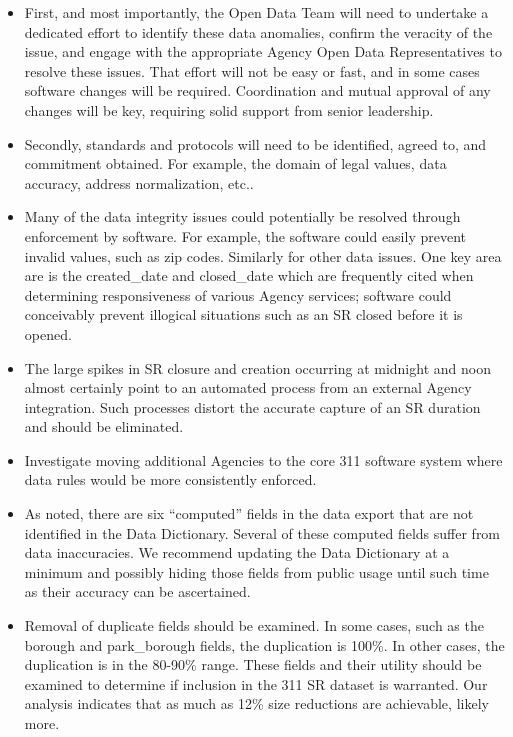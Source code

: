 \documentclass[12pt, titlepage]{article}
\begin{document}
\begin{itemize}
	\item First, and most importantly, the Open Data Team will need 
	to undertake a dedicated effort to identify these 
	data anomalies, confirm the veracity of the issue, 
	and engage with the appropriate Agency Open Data 
	Representatives to resolve these issues. That effort will not 
	be easy or fast, and in some cases software changes will 
	be required. Coordination and mutual approval of any 
	changes will be key, requiring solid support 
	from senior leadership.

	\item Secondly, standards and protocols will need to be 
	identified, agreed to, and commitment obtained. For example, 
	the domain of legal values, data accuracy, address normalization, etc..

	\item Many of the data integrity issues could potentially be 
	resolved through enforcement by software. For example, the 
	software could easily prevent invalid values, such as zip 
	codes. Similarly for other data issues. One key area are is the 
	created\_date and closed\_date which are frequently cited 
	when determining responsiveness of various Agency services; software
	could conceivably prevent illogical situations such as an SR closed 
	before it is opened.
	
	\item The large spikes in SR closure and creation occurring at 
	midnight and noon almost certainly point to an automated 
	process from an external Agency integration. Such processes distort 
	the accurate capture of an SR duration and should be eliminated.
	
	\item Investigate moving additional Agencies to the core 
	311 software system where data rules would 
	be more consistently enforced.
	
	\item As noted, there are six ``computed'' fields in the data export 
	that are not identified in the Data Dictionary. Several of 
	these computed fields suffer from data inaccuracies. We  
	recommend updating the Data Dictionary at a minimum and 
	possibly hiding those fields from public usage until such time as 
	their accuracy can be ascertained.
	
	\item Removal of duplicate fields should be examined.  In some cases, such 
	as the borough and park\_borough fields, the duplication is 100\%. In 
	other cases, the duplication is in the 80-90\% range. These fields and 
	their utility should be examined to determine if inclusion in the 
	311 SR dataset is warranted. Our analysis indicates that as much as 12\% 
	size reductions are achievable, likely more.
	

\end{itemize}
\end{document}
